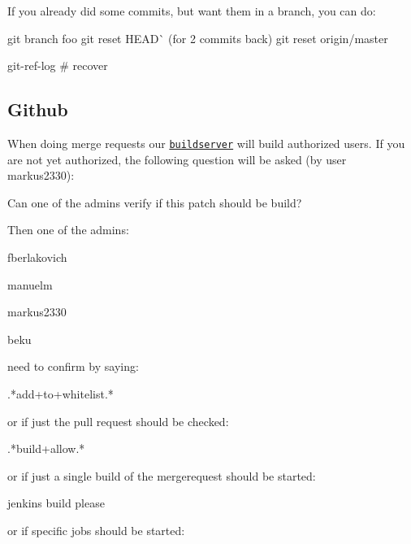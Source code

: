 If you already did some commits, but want them in a branch, you can do\+: \begin{DoxyVerb}    git branch foo
    git reset HEAD^^  (for 2 commits back)
    git reset origin/master

    git-ref-log # recover
\end{DoxyVerb}


\subsection*{Github}

When doing merge requests our \href{http://build.libelektra.org:8080}{\tt buildserver} will build authorized users. If you are not yet authorized, the following question will be asked (by user markus2330)\+: \begin{DoxyVerb}    Can one of the admins verify if this patch should be build?
\end{DoxyVerb}


Then one of the admins\+:


\begin{DoxyItemize}
\item fberlakovich
\item manuelm
\item markus2330
\item beku
\end{DoxyItemize}

need to confirm by saying\+: \begin{DoxyVerb}    .*add\W+to\W+whitelist.*
\end{DoxyVerb}


or if just the pull request should be checked\+: \begin{DoxyVerb}    .*build\W+allow.*
\end{DoxyVerb}


or if just a single build of the mergerequest should be started\+: \begin{DoxyVerb}    jenkins build please
\end{DoxyVerb}


or if specific jobs should be started\+:


